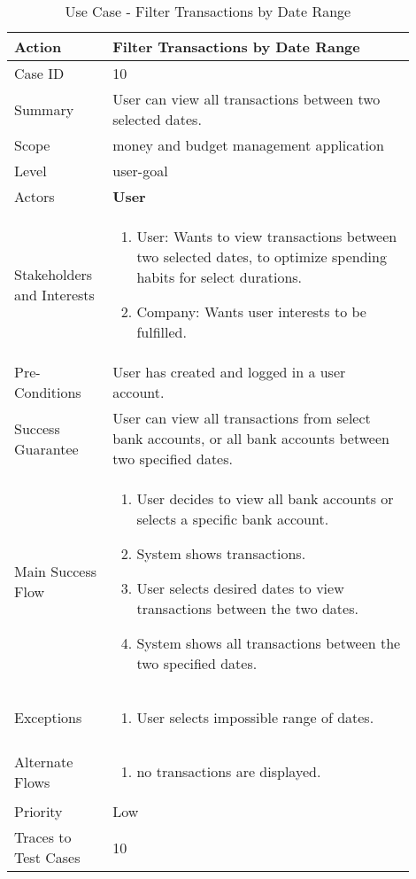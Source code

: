 \documentclass[11pt]{article}
\newcounter{use case ID}
\newcommand\tabularhead[1]{
    \begin{table}[ht]
        \addtocounter{use case ID}{1}
        \caption{Use Case \arabic{use case ID} - #1}
        \vspace{0.2cm}
        \begin{tabular}{|p{0.2\linewidth}|p{0.70\linewidth}|}
            \hline
            \textbf{Action} & \textbf{#1} \\
            \hline}
\newcommand\addrow[2]{#1 & #2\\ \hline}
\newcommand\addmulrow[2]{ \begin{minipage}[t][][t]{2.5cm}#1\end{minipage}
                &\begin{minipage}[t][][t]{11cm}
                    \begin{enumerate}[itemsep=-1ex] #2   \end{enumerate}
                \end{minipage}\vfill\\ \hline}
\newenvironment{usecase}{\tabularhead}
        {\hline\end{tabular}\end{table}}
\begin{document}
\begin{usecase}{Filter Transactions by Date Range}
    \addrow{Case ID}{10}
    \addrow{Summary}{User can view all transactions between two selected dates.}
    \addrow{Scope}{money and budget management application}
    \addrow{Level}{user-goal}
    \addrow{Actors}{\textbf{User}}
    \addmulrow{Stakeholders and Interests}{
    \item User: Wants to view transactions between two selected dates, to optimize spending habits for select durations.
    \item Company: Wants user interests to be fulfilled.}
    \addrow{Pre-Conditions}{User has created and logged in a user account.}
    \addrow{Success Guarantee}{User can view all transactions from select bank accounts, or all bank accounts between two specified dates.}
    \addmulrow{Main Success Flow}{
    \item User decides to view all bank accounts or selects a specific bank account.
    \item System shows transactions.
    \item User selects desired dates to view transactions between the two dates.
    \item System shows all transactions between the two specified dates.}
    \addmulrow{Exceptions}{
    \item User selects impossible range of dates.
    }
    \addmulrow{Alternate Flows}{
    \item no transactions are displayed.
    }
    \addrow{Priority}{Low}
    \addrow{Traces to Test Cases}{10}
\end{usecase}
\end{document}
